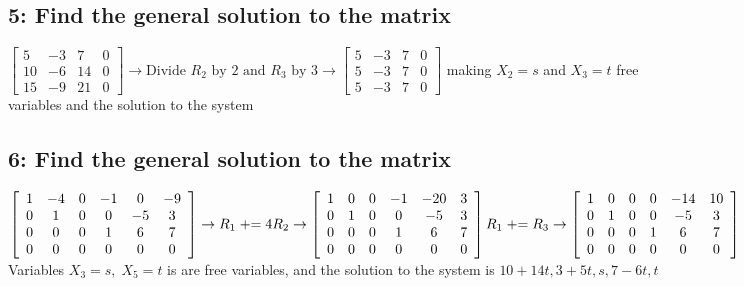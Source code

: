 \documentclass{article}
\begin{document}
\subsection*{5: Find the general solution to the matrix}
$\left[\begin{array}{ccc|c}
    5&-3&7&0\\
    10&-6&14&0\\ 
    15&-9&21&0
\end{array}\right]\rightarrow \text{Divide } R_2 \text{ by 2 and } R_3 \text{ by 3} \rightarrow
\left[\begin{array}{ccc|c}
    5&-3&7&0\\
    5&-3&7&0\\
    5&-3&7&0
\end{array}\right]$ making $X_2=s$ and $X_3=t$ free\\[0.1in] variables and the solution to the system 
\pagebreak
\subsection*{6: Find the general solution to the matrix}
$
\left[\begin{array}{cccccc}
    1 & -4 & 0 & -1 & 0 & -9 \\
    0 & 1 & 0 & 0 & -5 & 3 \\
    0 & 0 & 0 & 1 & 6 & 7  \\
    0 & 0 & 0 & 0 & 0 & 0
\end{array}\right] \rightarrow
R_1 \mathrel{+}= 4R_2 \rightarrow 
\left[\begin{array}{cccccc}
    1 & 0 & 0 & -1 & -20 & 3 \\
    0 & 1 & 0 & 0 & -5 & 3 \\
    0 & 0 & 0 & 1 & 6 & 7  \\
    0 & 0 & 0 & 0 & 0 & 0
\end{array}\right] \\[3mm]
R_1 \mathrel{+}= R_3 \rightarrow 
\left[\begin{array}{cccccc}
    1 & 0 & 0 & 0 & -14 & 10 \\
    0 & 1 & 0 & 0 & -5 & 3 \\
    0 & 0 & 0 & 1 & 6 & 7  \\
    0 & 0 & 0 & 0 & 0 & 0
\end{array}\right]
$
\\[0.1in] Variables $X_3=s, \; X_5=t$ is are free variables, and the solution to the system is $\boxed{10+14t, 3+5t, s, 7-6t, t}$
\end{document}
